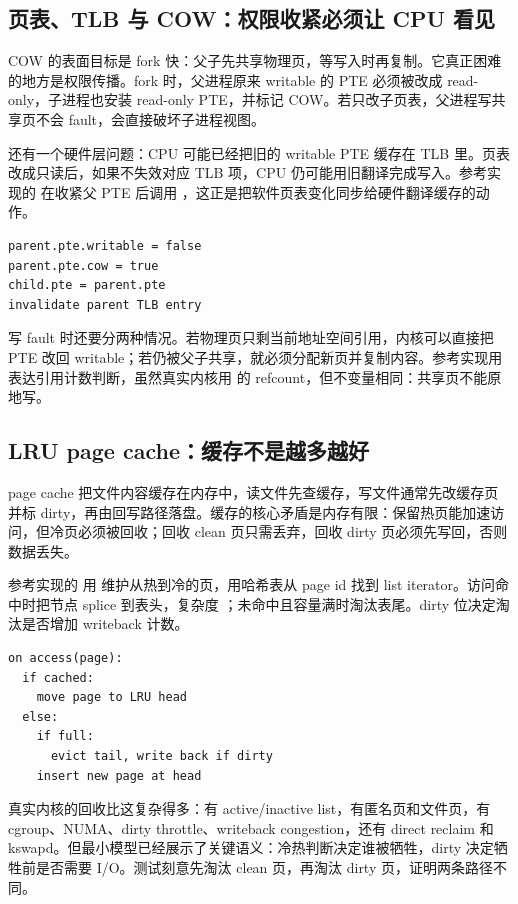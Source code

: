 \subsection{页表、TLB 与 COW：权限收紧必须让 CPU 看见}

COW 的表面目标是 fork 快：父子先共享物理页，等写入时再复制。它真正困难的地方是权限传播。fork 时，父进程原来 writable 的 PTE 必须被改成 read-only，子进程也安装 read-only PTE，并标记 COW。若只改子页表，父进程写共享页不会 fault，会直接破坏子进程视图。

还有一个硬件层问题：CPU 可能已经把旧的 writable PTE 缓存在 TLB 里。页表改成只读后，如果不失效对应 TLB 项，CPU 仍可能用旧翻译完成写入。参考实现的  在收紧父 PTE 后调用 ，这正是把软件页表变化同步给硬件翻译缓存的动作。

\begin{lstlisting}
parent.pte.writable = false
parent.pte.cow = true
child.pte = parent.pte
invalidate parent TLB entry
\end{lstlisting}

写 fault 时还要分两种情况。若物理页只剩当前地址空间引用，内核可以直接把 PTE 改回 writable；若仍被父子共享，就必须分配新页并复制内容。参考实现用  表达引用计数判断，虽然真实内核用  的 refcount，但不变量相同：共享页不能原地写。

\subsection{LRU page cache：缓存不是越多越好}

page cache 把文件内容缓存在内存中，读文件先查缓存，写文件通常先改缓存页并标 dirty，再由回写路径落盘。缓存的核心矛盾是内存有限：保留热页能加速访问，但冷页必须被回收；回收 clean 页只需丢弃，回收 dirty 页必须先写回，否则数据丢失。

参考实现的  用  维护从热到冷的页，用哈希表从 page id 找到 list iterator。访问命中时把节点 splice 到表头，复杂度 ；未命中且容量满时淘汰表尾。dirty 位决定淘汰是否增加 writeback 计数。

\begin{lstlisting}
on access(page):
  if cached:
    move page to LRU head
  else:
    if full:
      evict tail, write back if dirty
    insert new page at head
\end{lstlisting}

真实内核的回收比这复杂得多：有 active/inactive list，有匿名页和文件页，有 cgroup、NUMA、dirty throttle、writeback congestion，还有 direct reclaim 和 kswapd。但最小模型已经展示了关键语义：冷热判断决定谁被牺牲，dirty 决定牺牲前是否需要 I/O。测试刻意先淘汰 clean 页，再淘汰 dirty 页，证明两条路径不同。


